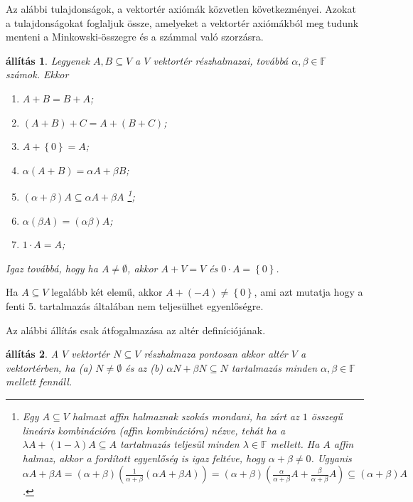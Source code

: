 \documentclass[9pt, a4paper, showtrims]{memoir}
\theoremstyle{plain}
\newtheorem{proposition}{állítás}[chapter]
\theoremstyle{remark}
\theoremstyle{definition}
\begin{document}
Az alábbi tulajdonságok, a vektortér axiómák közvetlen következményei.
Azokat a tulajdonságokat foglaljuk össze, amelyeket a vektortér axiómákból meg tudunk menteni
a Minkowski-összegre és a számmal való szorzásra.
\begin{proposition}\label{pr:Minkowski}
    Legyenek $A,B\subseteq V$ a $V$ vektortér részhalmazai,
    továbbá $\alpha,\beta\in\mathbb{F}$ számok.
    Ekkor 
    \begin{enumerate}
        \item $A+B=B+A$;
        \item $\left( A+B \right)+C=A+\left( B+C \right)$;
        \item $A+\left\{ 0 \right\}=A$;
        \item $\alpha\left( A+B \right)=\alpha A+\beta B$;
        \item $\left( \alpha+\beta \right) A\subseteq \alpha A+\beta A$%
            \footnote{
                Egy $A\subseteq V$ halmazt \emph{affin halmaznak}
                szokás mondani, 
                ha zárt az $1$ összegű lineáris kombinációra 
                (\emph{affin kombinációra})
                nézve, 
                tehát ha a $\lambda A+\left( 1-\lambda \right)A\subseteq A$ 
                tartalmazás teljesül minden $\lambda\in\mathbb{F}$
                mellett.
                Ha $A$ affin halmaz, 
                akkor a fordított egyenlőség is igaz feltéve, hogy $\alpha+\beta\neq 0$.
                Ugyanis
                $\alpha A+\beta A
                =
                \left( \alpha+\beta \right)\left( \frac{1}{\alpha+\beta}\left( \alpha A+\beta A \right) \right)
                =
                \left( \alpha+\beta \right)\left( \frac{\alpha}{\alpha+\beta}A+\frac{\beta}{\alpha+\beta}A \right)
                \subseteq 
                \left( \alpha+\beta \right)A$.
            };
        \item $\alpha\left( \beta A \right)=\left( \alpha\beta \right)A$;
        \item $1\cdot A=A$;
    \end{enumerate}
    Igaz továbbá, hogy ha $A\neq \emptyset$, akkor $A+V=V$ és $0\cdot A=\left\{ 0 \right\}$.
\end{proposition}
Ha $A\subseteq V$ legalább két elemű, 
akkor $A+\left( -A \right)\neq\left\{ 0 \right\}$, ami azt mutatja hogy a fenti 5. tartalmazás
általában nem teljesülhet egyenlőségre.

Az alábbi állítás csak átfogalmazása az altér definíciójának.
\begin{proposition}
    A $V$ vektortér $N\subseteq V$ részhalmaza pontosan akkor altér $V$ a vektortérben,
    ha 
    (a) $N\neq \emptyset$ és az 
    (b) $\alpha N+\beta N\subseteq N$ tartalmazás minden $\alpha,\beta\in\mathbb{F}$
    mellett fennáll.
\end{proposition}
\end{document}

